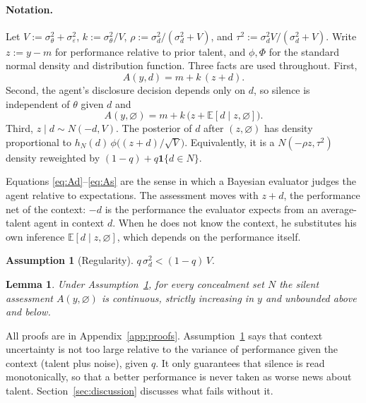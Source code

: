 \documentclass[11pt]{article}
\newtheorem{lemma}{Lemma}
\theoremstyle{definition}
\newtheorem{assumption}{Assumption}
\newcommand{\E}{\mathbb{E}}
\newcommand{\sil}{\varnothing}
\newcommand{\sd}{\sigma_d}
\newcommand{\sth}{\sigma_\theta}
\newcommand{\se}{\sigma_\varepsilon}
\begin{document}
\paragraph{Notation.} Let $V:=\sth^2+\se^2$, $k:=\sth^2/V$, $\rho:=\sd^2/(\sd^2+V)$, and $\tau^2:=\sd^2V/(\sd^2+V)$. Write $z:=y-m$ for performance relative to prior talent, and $\phi,\Phi$ for the standard normal density and distribution function. Three facts are used throughout. First,
\begin{equation}\label{eq:Ad}
A(y,d)=m+k\,(z+d).
\end{equation}
Second, the agent's disclosure decision depends only on $d$, so silence is independent of $\theta$ given $d$ and
\begin{equation}\label{eq:As}
A(y,\sil)=m+k\,\big(z+\E[d\mid z,\sil]\big).
\end{equation}
Third, $z\mid d\sim N(-d,V)$. The posterior of $d$ after $(z,\sil)$ has density proportional to $h_N(d)\,\phi\big((z+d)/\sqrt V\big)$. Equivalently, it is a $N(-\rho z,\tau^2)$ density reweighted by $(1-q)+q\mathbf 1\{d\in N\}$.

Equations \eqref{eq:Ad}--\eqref{eq:As} are the sense in which a Bayesian evaluator judges the agent relative to expectations. The assessment moves with $z+d$, the performance net of the context: $-d$ is the performance the evaluator expects from an average-talent agent in context $d$. When he does not know the context, he substitutes his own inference $\E[d\mid z,\sil]$, which depends on the performance itself.

\begin{assumption}[Regularity]\label{ass:R}
$q\,\sd^2<(1-q)\,V$.
\end{assumption}

\begin{lemma}\label{lem:monotone}
Under Assumption~\ref{ass:R}, for every concealment set $N$ the silent assessment $A(y,\sil)$ is continuous, strictly increasing in $y$ and unbounded above and below.
\end{lemma}

All proofs are in Appendix~\ref{app:proofs}. Assumption~\ref{ass:R} says that context uncertainty is not too large relative to the variance of performance given the context (talent plus noise), given $q$. It only guarantees that silence is read monotonically, so that a better performance is never taken as worse news about talent. Section~\ref{sec:discussion} discusses what fails without it.

\end{document}
